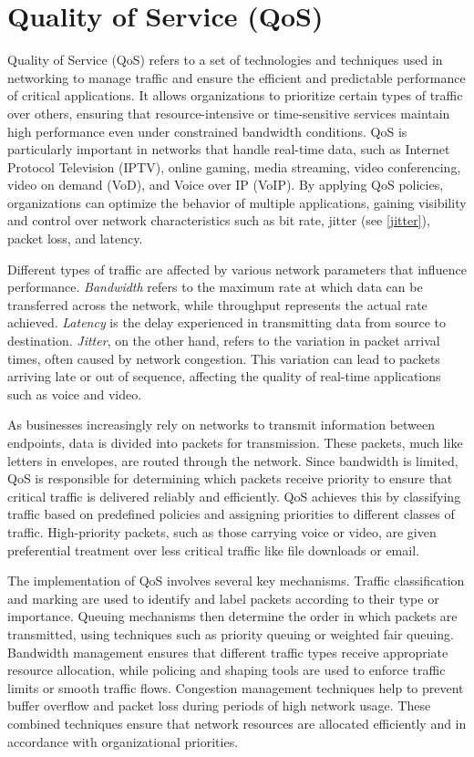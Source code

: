 \section{Quality of Service (QoS)}

Quality of Service (QoS) refers to a set of technologies and techniques used in networking to manage traffic and ensure the efficient and predictable performance of critical applications. It allows organizations to prioritize certain types of traffic over others, ensuring that resource-intensive or time-sensitive services maintain high performance even under constrained bandwidth conditions. QoS is particularly important in networks that handle real-time data, such as Internet Protocol Television (IPTV), online gaming, media streaming, video conferencing, video on demand (VoD), and Voice over IP (VoIP). By applying QoS policies, organizations can optimize the behavior of multiple applications, gaining visibility and control over network characteristics such as bit rate, jitter (see \ref{jitter}), packet loss, and latency.


Different types of traffic are affected by various network parameters that influence performance. \textit{Bandwidth} refers to the maximum rate at which data can be transferred across the network, while throughput represents the actual rate achieved. \textit{Latency} is the delay experienced in transmitting data from source to destination. \textit{Jitter}, on the other hand, refers to the variation in packet arrival times, often caused by network congestion. This variation can lead to packets arriving late or out of sequence, affecting the quality of real-time applications such as voice and video.\label{jitter}


As businesses increasingly rely on networks to transmit information between endpoints, data is divided into packets for transmission. These packets, much like letters in envelopes, are routed through the network. Since bandwidth is limited, QoS is responsible for determining which packets receive priority to ensure that critical traffic is delivered reliably and efficiently. QoS achieves this by classifying traffic based on predefined policies and assigning priorities to different classes of traffic. High-priority packets, such as those carrying voice or video, are given preferential treatment over less critical traffic like file downloads or email.

The implementation of QoS involves several key mechanisms. Traffic classification and marking are used to identify and label packets according to their type or importance. Queuing mechanisms then determine the order in which packets are transmitted, using techniques such as priority queuing or weighted fair queuing. Bandwidth management ensures that different traffic types receive appropriate resource allocation, while policing and shaping tools are used to enforce traffic limits or smooth traffic flows. Congestion management techniques help to prevent buffer overflow and packet loss during periods of high network usage. These combined techniques ensure that network resources are allocated efficiently and in accordance with organizational priorities.


